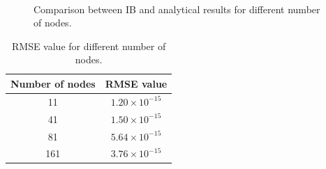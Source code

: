 \begin{figure}[H]
	\centering
	\quad
	\\
	\quad
	\caption{Comparison between IB and analytical results for different number of nodes.}
	\label{fig:C3_indirectForcing_nodeNumber}
\end{figure}

\begin{table}[H]
\centering
\begin{tabular}{c | c}
	 Number of nodes & RMSE value \\ \hline \hline
	 11 & $1.20 \times 10^{-15}$ \\ \hline
	 41 & $1.50 \times 10^{-15}$ \\ \hline
	 81 & $5.64 \times 10^{-15}$ \\ \hline
	 161 & $3.76 \times 10^{-15}$
\end{tabular}
\caption{RMSE value for different number of nodes.}
\label{table:C3_indirectForcing_nodeNumberRSME}
\end{table}

